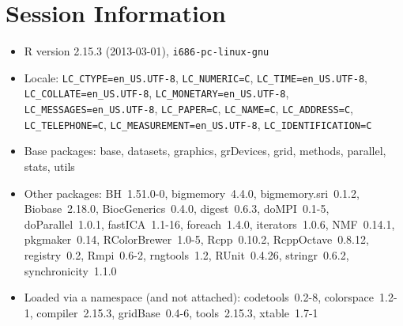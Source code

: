 \documentclass[10pt]{article}
\begin{document}
\section*{Session Information}
\begin{itemize}\raggedright
  \item R version 2.15.3 (2013-03-01), \verb|i686-pc-linux-gnu|
  \item Locale: \verb|LC_CTYPE=en_US.UTF-8|, \verb|LC_NUMERIC=C|, \verb|LC_TIME=en_US.UTF-8|, \verb|LC_COLLATE=en_US.UTF-8|, \verb|LC_MONETARY=en_US.UTF-8|, \verb|LC_MESSAGES=en_US.UTF-8|, \verb|LC_PAPER=C|, \verb|LC_NAME=C|, \verb|LC_ADDRESS=C|, \verb|LC_TELEPHONE=C|, \verb|LC_MEASUREMENT=en_US.UTF-8|, \verb|LC_IDENTIFICATION=C|
  \item Base packages: base, datasets, graphics, grDevices, grid,
    methods, parallel, stats, utils
  \item Other packages: BH~1.51.0-0, bigmemory~4.4.0,
    bigmemory.sri~0.1.2, Biobase~2.18.0, BiocGenerics~0.4.0,
    digest~0.6.3, doMPI~0.1-5, doParallel~1.0.1, fastICA~1.1-16,
    foreach~1.4.0, iterators~1.0.6, NMF~0.14.1, pkgmaker~0.14,
    RColorBrewer~1.0-5, Rcpp~0.10.2, RcppOctave~0.8.12, registry~0.2,
    Rmpi~0.6-2, rngtools~1.2, RUnit~0.4.26, stringr~0.6.2,
    synchronicity~1.1.0
  \item Loaded via a namespace (and not attached): codetools~0.2-8,
    colorspace~1.2-1, compiler~2.15.3, gridBase~0.4-6, tools~2.15.3,
    xtable~1.7-1
\end{itemize}
\end{document}
